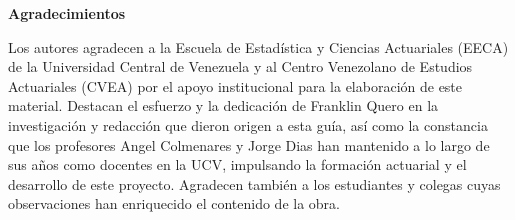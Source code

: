 \vfill
\newpage

\thispagestyle{empty}
\vspace*{1.5cm}
\begin{center}
{\large\bfseries Agradecimientos}
\end{center}
\vspace{1.5cm}

Los autores agradecen a la Escuela de Estadística y Ciencias Actuariales (EECA) de la Universidad Central de Venezuela y al Centro Venezolano de Estudios Actuariales (CVEA) por el apoyo institucional para la elaboración de este material. Destacan el esfuerzo y la dedicación de Franklin Quero en la investigación y redacción que dieron origen a esta guía, así como la constancia que los profesores Angel Colmenares y Jorge Dias han mantenido a lo largo de sus años como docentes en la UCV, impulsando la formación actuarial y el desarrollo de este proyecto. Agradecen también a los estudiantes y colegas cuyas observaciones han enriquecido el contenido de la obra.

\vfill
\newpage
\pagestyle{plain}
\let\cleardoublepage\savedcleardoublepage

